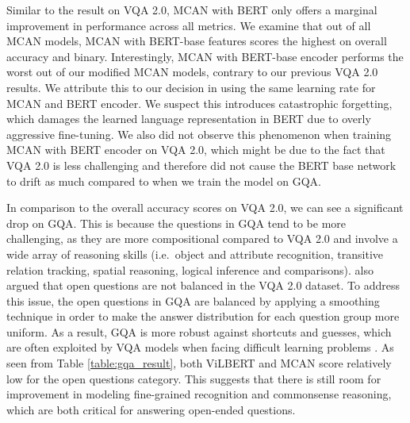 \documentclass{article}
\begin{document}
Similar to the result on VQA 2.0, MCAN with BERT only offers a marginal improvement in performance across all metrics. We examine that out of all MCAN models, MCAN with BERT-base features scores the highest on overall accuracy and binary. Interestingly, MCAN with BERT-base encoder performs the worst out of our modified MCAN models, contrary to our previous VQA 2.0 results. We attribute this to our decision in using the same learning rate for MCAN and BERT encoder. We suspect this introduces catastrophic forgetting, which damages the learned language representation in BERT due to overly aggressive fine-tuning. We also did not observe this phenomenon when training MCAN with BERT encoder on VQA 2.0, which might be due to the fact that VQA 2.0 is less challenging and therefore did not cause the BERT base network to drift as much compared to when we train the model on GQA.


In comparison to the overall accuracy scores on VQA 2.0, we can see a significant drop on GQA. This is because the questions in GQA tend to be more challenging, as they are more compositional compared to VQA 2.0 and involve a wide array of reasoning skills (i.e.\, object and attribute recognition, transitive relation tracking, spatial reasoning, logical inference and comparisons). \citet{hudson2019gqa} also argued that open questions are not balanced in the VQA 2.0 dataset. To address this issue, the open questions in GQA are balanced by applying a smoothing technique in order to make the answer distribution for each question group more uniform. As a result, GQA is more robust against shortcuts and guesses, which are often exploited by VQA models when facing difficult learning problems \citep{agrawal12018gvqa}. As seen from Table \ref{table:gqa_result}, both ViLBERT and MCAN score relatively low for the open questions category. This suggests that there is still room for improvement in modeling fine-grained recognition and commonsense reasoning, which are both critical for answering open-ended questions.

\end{document}
